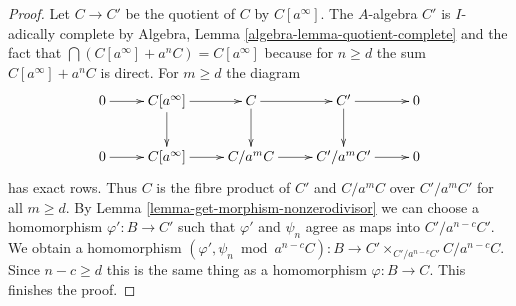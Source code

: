 \documentclass[10pt,a4paper]{amsart}
\theoremstyle{plain}
\theoremstyle{definition}
\theoremstyle{remark}
\numberwithin{equation}{subsection}
\begin{document}
\begin{proof}
Let $C \to C'$ be the quotient of $C$ by $C[a^\infty]$. The $A$-algebra
$C'$ is $I$-adically complete by
Algebra, Lemma \ref{algebra-lemma-quotient-complete}
and the fact that $\bigcap (C[a^\infty] + a^nC) = C[a^\infty]$
because for $n \geq d$ the sum $C[a^\infty] + a^nC$ is direct.
For $m \geq d$ the diagram
$$
\xymatrix{
0 \ar[r] &
C[a^\infty] \ar[r] \ar[d] &
C \ar[r] \ar[d] & C' \ar[r] \ar[d] & 0 \\
0 \ar[r] &
C[a^\infty] \ar[r] &
C/a^m C \ar[r] & C'/a^m C' \ar[r] & 0
}
$$
has exact rows. Thus $C$ is the fibre product of $C'$ and
$C/a^mC$ over $C'/a^mC'$ for all $m \geq d$. By
Lemma \ref{lemma-get-morphism-nonzerodivisor}
we can choose a homomorphism $\varphi' : B \to C'$
such that $\varphi'$ and $\psi_n$ agree as maps into $C'/a^{n - c}C'$.
We obtain a homomorphism $(\varphi', \psi_n \bmod a^{n - c}C) : B \to
C' \times_{C'/a^{n - c}C'} C/a^{n - c}C$.
Since $n - c \geq d$ this is the same thing as a homomorphism
$\varphi : B \to C$. This finishes the proof.
\end{proof}
\end{document}
